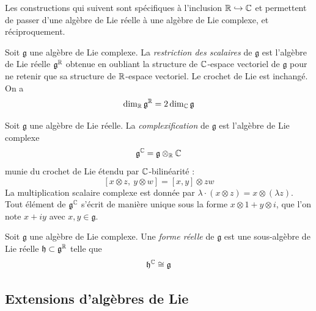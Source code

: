 \noindent
Les constructions qui suivent sont spécifiques à l'inclusion $\mathbb{R} \hookrightarrow \mathbb{C}$ et permettent de passer d'une algèbre de Lie réelle à une algèbre de Lie complexe, et réciproquement.

\begin{definition}
    Soit $\mathfrak{g}$ une algèbre de Lie complexe. La \emph{restriction des scalaires} de $\mathfrak{g}$ est l'algèbre de Lie réelle $\mathfrak{g}^{\mathbb{R}}$ obtenue en oubliant la structure de $\mathbb{C}$-espace vectoriel de $\mathfrak{g}$ pour ne retenir que sa structure de $\mathbb{R}$-espace vectoriel. Le crochet de Lie est inchangé. On a
    $$\dim_{\mathbb{R}} \mathfrak{g}^{\mathbb{R}} = 2 \dim_{\mathbb{C}} \mathfrak{g}$$
\end{definition}

\begin{definition}
    Soit $\mathfrak{g}$ une algèbre de Lie réelle. La \emph{complexification} de $\mathfrak{g}$ est l'algèbre de Lie complexe
    $$\mathfrak{g}^{\mathbb{C}} = \mathfrak{g} \otimes_{\mathbb{R}} \mathbb{C}$$
    munie du crochet de Lie étendu par $\mathbb{C}$-bilinéarité :
    $$[x \otimes z,\ y \otimes w] = [x, y] \otimes zw$$
    La multiplication scalaire complexe est donnée par $\lambda \cdot (x \otimes z) = x \otimes (\lambda z)$. Tout élément de $\mathfrak{g}^{\mathbb{C}}$ s'écrit de manière unique sous la forme $x \otimes 1 + y \otimes i$, que l'on note $x + iy$ avec $x, y \in \mathfrak{g}$.
\end{definition}

\begin{definition}
    Soit $\mathfrak{g}$ une algèbre de Lie complexe. Une \emph{forme réelle} de $\mathfrak{g}$ est une sous-algèbre de Lie réelle $\mathfrak{h} \subset \mathfrak{g}^{\mathbb{R}}$ telle que
    $$\mathfrak{h}^{\mathbb{C}} \cong \mathfrak{g}$$
\end{definition}

\subsection{Extensions d'algèbres de Lie}

